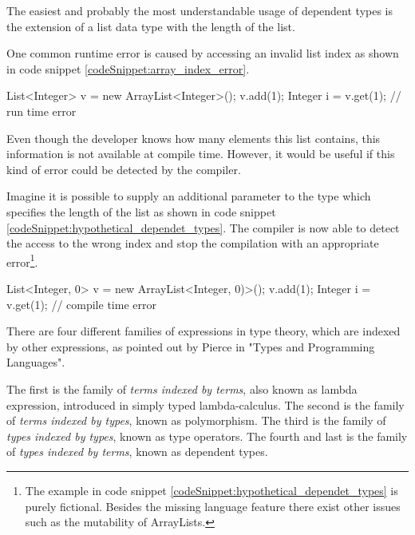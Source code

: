 The easiest and probably the most understandable usage of dependent types is the extension of a list data type with the length of the list. 

One common runtime error is caused by accessing an invalid list index as shown in code snippet \ref{codeSnippet:array_index_error}.

\begin{codesnippet}[caption={ArrayList index error}, label={codeSnippet:array_index_error}]
List<Integer> v = new ArrayList<Integer>();
v.add(1);
Integer i = v.get(1); // run time error
\end{codesnippet}

Even though the developer knows how many elements this list contains, this information is not available at compile time. 
However, it would be useful if this kind of error could be detected by the compiler.

Imagine it is possible to supply an additional parameter to the type which specifies the length of the list as shown in code snippet \ref{codeSnippet:hypothetical_dependet_types}. 
The compiler is now able to detect the access to the wrong index and stop the compilation with an appropriate error\footnote{The example in code snippet \ref{codeSnippet:hypothetical_dependet_types} is purely fictional. Besides the missing language feature there exist other issues such as the mutability of ArrayLists.}.
\begin{adjustbox}{width=\columnwidth}
\begin{codesnippet}[escapeinside={(*}{*)}, caption={ArrayList with size parameter}, label={codeSnippet:hypothetical_dependet_types}]
List<Integer, 0> v = new ArrayList<Integer, 0)>();
v.add(1);
Integer i = v.get(1); // compile time error
\end{codesnippet}
\end{adjustbox}
\linebreak

There are four different families of expressions in type theory, which are indexed by other expressions, as pointed out by Pierce in "Types and Programming Languages"\cite{10.5555/1076265}. 

The first is the family of \emph{terms indexed by terms}, also known as lambda expression, introduced in simply typed lambda-calculus. 
The second is the family of \emph{terms indexed by types}, known as polymorphism. 
The third is the family of \emph{types indexed by types}, known as type operators.
The fourth and last is the family of \emph{types indexed by terms}, known as dependent types.

